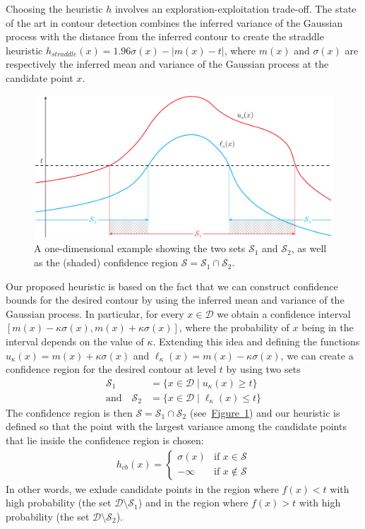 \documentclass[11pt]{article} %
\newcommand{\figref}[1]{\hyperref[#1]{\mbox{Figure~\ref*{#1}}}}
\newcommand{\twopartdef}[4]
{
	\left\{
		\begin{array}{ll}
			#1 & \mbox{if } #2 \\
			#3 & \mbox{if } #4
		\end{array}
	\right.
}
\begin{document}
Choosing the heuristic $h$ involves an exploration-exploitation trade-off. The
state of the art in contour detection combines the inferred variance of the
Gaussian process with the
distance from the inferred contour to create the straddle~\cite{bryan2005}
heuristic ${h_{straddle}(x) = 1.96\sigma(x) - | m(x) - t |}$, where $m(x)$
and $\sigma(x)$ are respectively the inferred mean and variance of the Gaussian
process at the candidate point $x$.

\begin{figure}[tb]
  \centering
  \includegraphics[width=\textwidth]{figures/cb}
  \caption{A one-dimensional example showing the two sets $\mathcal{S}_1$ and
           $\mathcal{S}_2$, as well as the (shaded) confidence region
           $\mathcal{S} = \mathcal{S}_1\cap\mathcal{S}_2$.}
  \label{fig:cb}
  \vspace{-0.5em}
\end{figure}

Our proposed heuristic is based on the fact that we can construct confidence
bounds for the desired contour by using the inferred mean and variance of
the Gaussian process. In particular, for every $x \in \mathcal{D}$ we obtain
a confidence interval ${[m(x) - \kappa\sigma(x), m(x) + \kappa\sigma(x)]}$,
where the probability of $x$ being in the interval depends on the value
of $\kappa$. Extending this idea and defining the functions
$u_{\kappa}(x) = m(x) + \kappa\sigma(x)$ and
$\ell_{\kappa}(x) = m(x) - \kappa\sigma(x)$,
we can create a confidence region for
the desired contour at level $t$ by using two sets
\begin{align*}
  \mathcal{S}_1 &= \{x \in \mathcal{D} \mid u_{\kappa}(x) \geq t\}\\
  \text{and}\hspace{1em}
  \mathcal{S}_2 &= \{x \in \mathcal{D} \mid \ell_{\kappa}(x) \leq t\}
\end{align*}
The confidence region is then
$\mathcal{S} = \mathcal{S}_1\cap\mathcal{S}_2$ (see~\figref{fig:cb}) and our
heuristic is defined
so that the point with the largest variance among the candidate points that
lie inside the confidence region is chosen:
\begin{align}\label{eq:hcb}
  h_{cb}(x) = \twopartdef { \sigma(x) } {x \in \mathcal{S}} {-\infty} {x \notin \mathcal{S}}
\end{align}
In other words, we exlude candidate points in the region where
$f(x) < t$ with high probability (the set $\mathcal{D}\setminus\mathcal{S}_1$)
and in the region where $f(x) > t$ with high probability
(the set $\mathcal{D}\setminus\mathcal{S}_2$).
\end{document}
